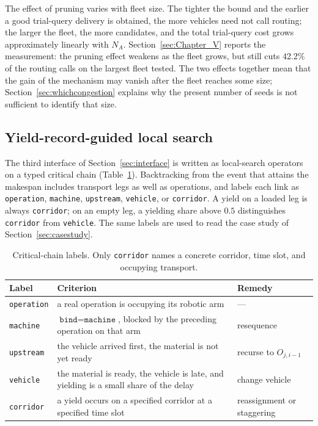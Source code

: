 \documentclass[manuscript,screen,review]{acmart}
\newcommand{\RouteCallCutLo}{42.2\%}     %
\begin{document}
The effect of pruning varies with fleet size.
The tighter the bound and the earlier a good trial-query delivery is obtained, the more vehicles need not call routing; the larger the fleet, the more candidates, and the total trial-query cost grows approximately linearly with $N_A$.
Section~\ref{sec:Chapter_V} reports the measurement: the pruning effect weakens as the fleet grows, but still cuts \RouteCallCutLo{} of the routing calls on the largest fleet tested.
The two effects together mean that the gain of the mechanism may vanish after the fleet reaches some size; Section~\ref{sec:whichcongestion} explains why the present number of seeds is not sufficient to identify that size.

\subsection{Yield-record-guided local search}
\label{sec:ls}

The third interface of Section~\ref{sec:interface} is written as local-search operators on a typed critical chain (Table~\ref{tab:attrib}).
Backtracking from the event that attains the makespan includes transport legs as well as operations, and labels each link as \texttt{operation}, \texttt{machine}, \texttt{upstream}, \texttt{vehicle}, or \texttt{corridor}.
A yield on a loaded leg is always \texttt{corridor}; on an empty leg, a yielding share above $0.5$ distinguishes \texttt{corridor} from \texttt{vehicle}.
The same labels are used to read the case study of Section~\ref{sec:casestudy}.

\begin{table}[t]
  \caption{Critical-chain labels.
  Only \texttt{corridor} names a concrete corridor, time slot, and occupying transport.}
\label{tab:attrib}
\footnotesize
\begin{tabular}{@{}llp{2.55cm}@{}}
\toprule
Label & Criterion & Remedy \\
\midrule
\texttt{operation} & a real operation is occupying its robotic arm & --- \\
\texttt{machine} & $\texttt{bind}=\texttt{machine}$, blocked by the preceding operation on that arm
  & resequence \\
\texttt{upstream} & the vehicle arrived first, the material is not yet ready & recurse to $O_{j,i-1}$ \\
\texttt{vehicle} & the material is ready, the vehicle is late, and yielding is a small share of the delay & change vehicle \\
\texttt{corridor} & a yield occurs on a specified corridor at a specified time slot & reassignment or staggering \\
\bottomrule
\end{tabular}
\end{table}
\end{document}
